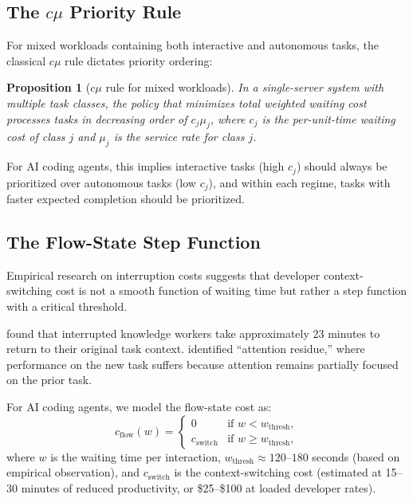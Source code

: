 \documentclass[11pt, a4paper, copyright]{googledeepmind}
\newtheorem{proposition}{Proposition}[section]
\begin{document}
\subsection{The $c\mu$ Priority Rule}

For mixed workloads containing both interactive and autonomous tasks, the classical $c\mu$ rule \citep{vanmieghem1995} dictates priority ordering:

\begin{proposition}[$c\mu$ rule for mixed workloads]\label{prop:cmu}
In a single-server system with multiple task classes, the policy that minimizes total weighted waiting cost processes tasks in decreasing order of $c_j \mu_j$, where $c_j$ is the per-unit-time waiting cost of class $j$ and $\mu_j$ is the service rate for class $j$.
\end{proposition}

For AI coding agents, this implies interactive tasks (high $c_j$) should always be prioritized over autonomous tasks (low $c_j$), and within each regime, tasks with faster expected completion should be prioritized.

\subsection{The Flow-State Step Function}

Empirical research on interruption costs suggests that developer context-switching cost is not a smooth function of waiting time but rather a step function with a critical threshold.

\citet{mark2008interrupted} found that interrupted knowledge workers take approximately 23 minutes to return to their original task context. \citet{leroy2009} identified ``attention residue,'' where performance on the new task suffers because attention remains partially focused on the prior task.

For AI coding agents, we model the flow-state cost as:
\begin{equation}\label{eq:flow-state}
    c_{\text{flow}}(w) = \begin{cases}
        0 & \text{if } w < w_{\text{thresh}}, \\
        c_{\text{switch}} & \text{if } w \geq w_{\text{thresh}},
    \end{cases}
\end{equation}
where $w$ is the waiting time per interaction, $w_{\text{thresh}} \approx 120$--$180$ seconds (based on empirical observation), and $c_{\text{switch}}$ is the context-switching cost (estimated at 15--30 minutes of reduced productivity, or \$25--\$100 at loaded developer rates).
\end{document}
